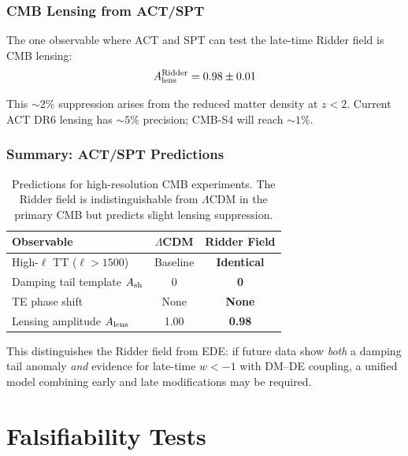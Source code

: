 \documentclass[twocolumn,showpacs,preprintnumbers,amsmath,amssymb,prd]{revtex4-2}
\begin{document}
\subsubsection{CMB Lensing from ACT/SPT}

The one observable where ACT and SPT can test the late-time Ridder field is CMB lensing:
\begin{equation}
A_{\rm lens}^{\rm Ridder} = 0.98 \pm 0.01
\end{equation}

This $\sim 2\%$ suppression arises from the reduced matter density at $z < 2$. Current ACT DR6 lensing has $\sim 5\%$ precision; CMB-S4 will reach $\sim 1\%$.

\subsubsection{Summary: ACT/SPT Predictions}

\begin{table}[h]
\centering
\begin{tabular}{lcc}
\toprule
Observable & $\Lambda$CDM & Ridder Field \\
\midrule
High-$\ell$ TT ($\ell > 1500$) & Baseline & \textbf{Identical} \\
Damping tail template $A_{\rm sh}$ & 0 & \textbf{0} \\
TE phase shift & None & \textbf{None} \\
Lensing amplitude $A_{\rm lens}$ & 1.00 & \textbf{0.98} \\
\bottomrule
\end{tabular}
\caption{Predictions for high-resolution CMB experiments. The Ridder field is indistinguishable from $\Lambda$CDM in the primary CMB but predicts slight lensing suppression.}
\label{tab:act_spt}
\end{table}

This distinguishes the Ridder field from EDE: if future data show \textit{both} a damping tail anomaly \textit{and} evidence for late-time $w < -1$ with DM--DE coupling, a unified model combining early and late modifications may be required.

\section{Falsifiability Tests}
\label{sec:falsify}
\end{document}
